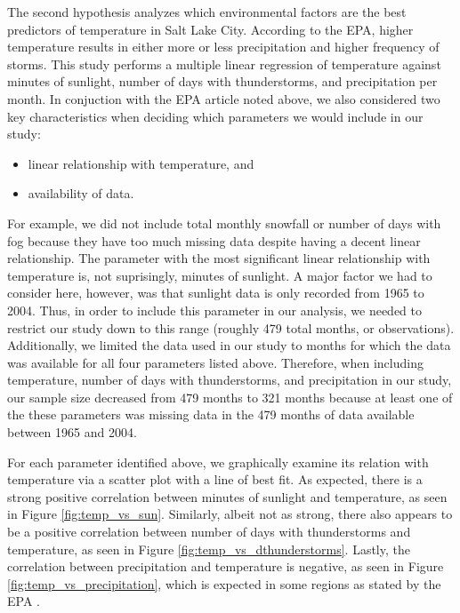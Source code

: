 The second hypothesis analyzes which environmental factors are the best predictors of temperature in Salt Lake City. According to the EPA, higher temperature results in either more or less precipitation and higher frequency of storms\cite{epa_utah}. This study performs a multiple linear regression of temperature against minutes of sunlight, number of days with thunderstorms, and precipitation per month. In conjuction with the EPA article noted above, we also considered two key characteristics when deciding which parameters we would include in our study: 

\begin{itemize}
	\item linear relationship with temperature, and
	\item availability of data.
\end{itemize}

For example, we did not include total monthly snowfall or number of days with fog because they have too much missing data despite having a decent linear relationship. The parameter with the most significant linear relationship with temperature is, not suprisingly, minutes of sunlight. A major factor we had to consider here, however, was that sunlight data is only recorded from 1965 to 2004. Thus, in order to include this parameter in our analysis, we needed to restrict our study down to this range (roughly 479 total months, or observations). Additionally, we limited the data used in our study to months for which the data was available for all four parameters listed above. Therefore, when including temperature, number of days with thunderstorms, and precipitation in our study, our sample size decreased from 479 months to 321 months because at least one of the these parameters was missing data in the 479 months of data available between 1965 and 2004.

For each parameter identified above, we graphically examine its relation with temperature via a scatter plot with a line of best fit. As expected, there is a strong positive correlation between minutes of sunlight and temperature, as seen in Figure \ref{fig:temp_vs_sun}. Similarly, albeit not as strong, there also appears to be a positive correlation between number of days with thunderstorms and temperature, as seen in Figure \ref{fig:temp_vs_dthunderstorms}. Lastly, the correlation between precipitation and temperature is negative, as seen in Figure \ref{fig:temp_vs_precipitation}, which is expected in some regions as stated by the EPA \cite{epa_utah}.

